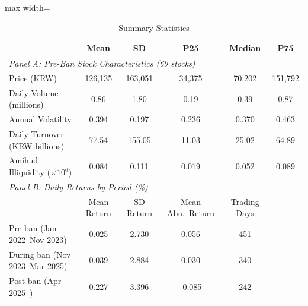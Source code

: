 \begin{table}[t]
\centering
\caption{Summary Statistics}
\label{tab:summary}
\small
\begin{adjustbox}{max width=\textwidth}
\begin{tabular}{lccccc}
\hline\hline
 & Mean & SD & P25 & Median & P75 \\
\hline
\multicolumn{6}{l}{\textit{Panel A: Pre-Ban Stock Characteristics (69 stocks)}} \\
Price (KRW) & 126,135 & 163,051 & 34,375 & 70,202 & 151,792 \\
Daily Volume (millions) & 0.86 & 1.80 & 0.19 & 0.39 & 0.87 \\
Annual Volatility & 0.394 & 0.197 & 0.236 & 0.370 & 0.463 \\
Daily Turnover (KRW billions) & 77.54 & 155.05 & 11.03 & 25.02 & 64.89 \\
Amihud Illiquidity ($\times 10^6$) & 0.084 & 0.111 & 0.019 & 0.052 & 0.089 \\
\hline
\multicolumn{6}{l}{\textit{Panel B: Daily Returns by Period (\%)}} \\
 & Mean Return & SD Return & Mean Abn.~Return & Trading Days & \\
\hline
Pre-ban (Jan 2022--Nov 2023) & 0.025 & 2.730 & 0.056 & 451 & \\
During ban (Nov 2023--Mar 2025) & 0.039 & 2.884 & 0.030 & 340 & \\
Post-ban (Apr 2025--) & 0.227 & 3.396 & -0.085 & 242 & \\
\hline\hline
\end{tabular}
\end{adjustbox}
\par{}
\end{table}
